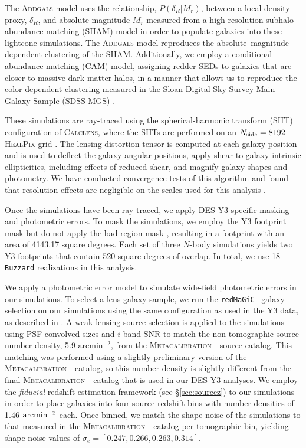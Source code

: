 \documentclass[aps, prd,twocolumn,superscriptaddress,nofootinbib,preprintnumbers]{revtex4-1}
\newcommand{\redmagic}{\texttt{redMaGiC} }
\newcommand{\buzzard}{\texttt{Buzzard} }
\newcommand{\metacal}{{\textsc{Metacalibration}~}}
\newcommand{\gary}[1]{\textcolor{red}{#1}}
\begin{document}
The \textsc{Addgals} model uses the relationship, $P(\delta_{R}|M_r)$, between a local density proxy, $\delta_{R}$, and absolute magnitude $M_r$ measured from a high-resolution subhalo abundance matching (SHAM) model in order to populate galaxies into these lightcone simulations. The \textsc{Addgals} model reproduces the absolute--magnitude--dependent clustering of the SHAM. 
Additionally, we employ a conditional abundance matching (CAM) model, assigning redder SEDs to galaxies that are closer to massive dark matter halos, in a manner that allows us to reproduce the color-dependent clustering measured in the Sloan Digital Sky Survey Main Galaxy Sample (SDSS MGS) \citep{Addgals, DeRose2020b}. 

These simulations are ray-traced using the spherical-harmonic transform (SHT) configuration of \textsc{Calclens}, where the SHTs are performed on an $N_{\rm side}=8192$ \textsc{HealPix} grid \citep{Becker2013}. The lensing distortion tensor is computed at each galaxy position and is used to deflect the galaxy angular positions, apply shear to galaxy intrinsic ellipticities, including effects of reduced shear, and magnify galaxy shapes and photometry. We have conducted convergence tests of this algorithm and found that resolution effects are negligible on the scales used for this analysis \citep{DeRose2019}.

Once the simulations have been ray-traced, we apply DES Y3-specific masking and photometric errors. To mask the simulations, we employ the Y3 footprint mask but do not apply the bad region mask \citep{y3-gold}, resulting in a footprint with an area of 4143.17 square degrees. Each set of three $N$-body simulations yields two Y3 footprints that contain 520 square degrees of overlap. In total, we use 18 \buzzard realizations in this analysis. 

We apply a photometric error model to simulate wide-field photometric errors in our simulations. To select a lens galaxy sample, we run the \redmagic\ galaxy selection on our simulations using the same configuration as used in the Y3 data, as described in \citet*{y3-galaxyclustering}. A weak lensing source selection is applied to the simulations using PSF-convolved sizes and $i$-band SNR to match the non-tomographic source number density, 5.9 $\textrm{arcmin}^{-2}$, from the \metacal\ source catalog. This matching was performed using a slightly preliminary version of the \metacal\ catalog, so this number density is slightly different from the final \metacal\ catalog that is used in our DES Y3 analyses. We employ the \textit{fiducial} redshift estimation framework (see \S\ref{sec:sourcez}) to our simulations in order to place galaxies into four source redshift bins with number densities of 1.46 $\rm arcmin^{-2}$ each. Once binned, we match the shape noise of the simulations to that measured in the \metacal\ catalog per tomographic bin, yielding shape noise values of $\sigma_{e}=[0.247, 0.266, 0.263, 0.314]$.
\end{document}
